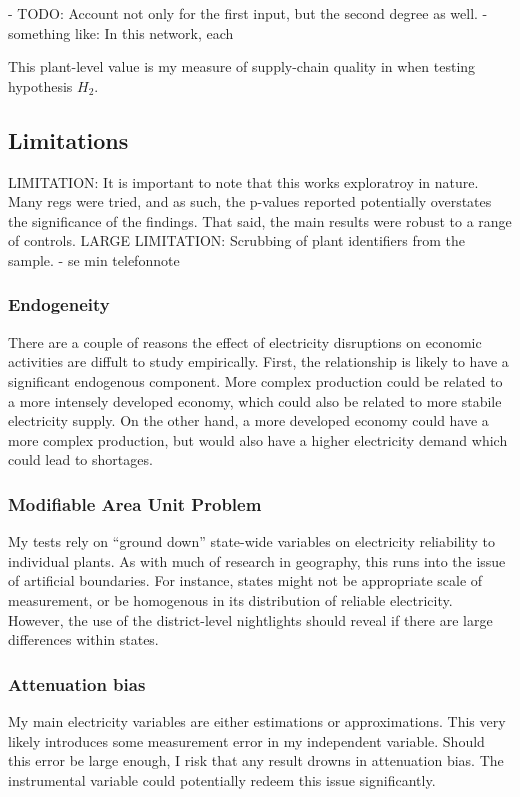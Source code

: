 \documentclass[11pt]{article}
\begin{document}
- TODO: Account not only for the first input, but the second degree as well. - something like: In this network, each


This plant-level value is my measure of supply-chain quality in when testing hypothesis \(H_2\).

\subsection{Limitations}
\label{sec:org979560b}

LIMITATION: It is important to note that this works exploratroy in nature. Many regs were tried, and as such, the p-values reported potentially overstates the significance of the findings. That said, the main results were robust to a range of controls.
LARGE LIMITATION: Scrubbing of plant identifiers from the sample. - se min telefonnote

\subsubsection{Endogeneity}
\label{sec:orgd4457e7}
There are a couple of reasons the effect of electricity disruptions on economic activities are diffult to study empirically. First, the relationship is likely to have a significant endogenous component. More complex production could be related to a more intensely developed economy, which could also be related to more stabile electricity supply. On the other hand, a more developed economy could have a more complex production, but would also have a higher electricity demand which could lead to shortages.

\subsubsection{Modifiable Area Unit Problem}
\label{sec:org4e3cc26}
My tests rely on ``ground down'' state-wide variables on electricity reliability to individual plants. As with much of research in geography, this runs into the issue of artificial boundaries. For instance, states might not be appropriate scale of measurement, or be homogenous in its distribution of reliable electricity. However, the use of the district-level nightlights should reveal if there are large differences within states.

\subsubsection{Attenuation bias}
\label{sec:orge917ac0}
My main electricity variables are either estimations or approximations. This very likely introduces some measurement error in my independent variable. Should this error be large enough, I risk that any result drowns in attenuation bias. The instrumental variable could potentially redeem this issue significantly.
\end{document}
